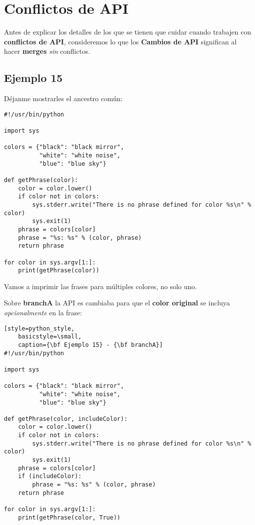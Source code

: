
\section{Conflictos de API}

Antes de explicar los detalles de los que se tienen que cuidar cuando trabajen con {\bf conflictos de API}, consideremos lo que los
{\bf Cambios de API} significan al hacer {\bf merges} {\it sin} conflictos.

\subsection{Ejemplo 15}
\label{example_15}

Déjanme mostrarles el ancestro común:
\begin{lstlisting}[style=python_style,
	basicstyle=\small,
	caption={\bf Ejemplo 15} - ancestro común]
#!/usr/bin/python

import sys

colors = {"black": "black mirror",
          "white": "white noise",
          "blue": "blue sky"}

def getPhrase(color):
    color = color.lower()
    if color not in colors:
        sys.stderr.write("There is no phrase defined for color %s\n" % color)
        sys.exit(1)
    phrase = colors[color]
    phrase = "%s: %s" % (color, phrase)
    return phrase

for color in sys.argv[1:]:
    print(getPhrase(color))
\end{lstlisting}

Vamos a imprimir las frases para múltiples colores, no solo uno.

Sobre {\bf branchA} la API es cambiaba para que el {\bf color original} se incluya {\it opcionalmente} en la frase:
\begin{lstlisting}[style=python_style,
	basicstyle=\small,
	caption={\bf Ejemplo 15} - {\bf branchA}]
#!/usr/bin/python

import sys

colors = {"black": "black mirror",
          "white": "white noise",
          "blue": "blue sky"}

def getPhrase(color, includeColor):
    color = color.lower()
    if color not in colors:
        sys.stderr.write("There is no phrase defined for color %s\n" % color)
        sys.exit(1)
    phrase = colors[color]
    if (includeColor):
        phrase = "%s: %s" % (color, phrase)
    return phrase

for color in sys.argv[1:]:
    print(getPhrase(color, True))
\end{lstlisting}

